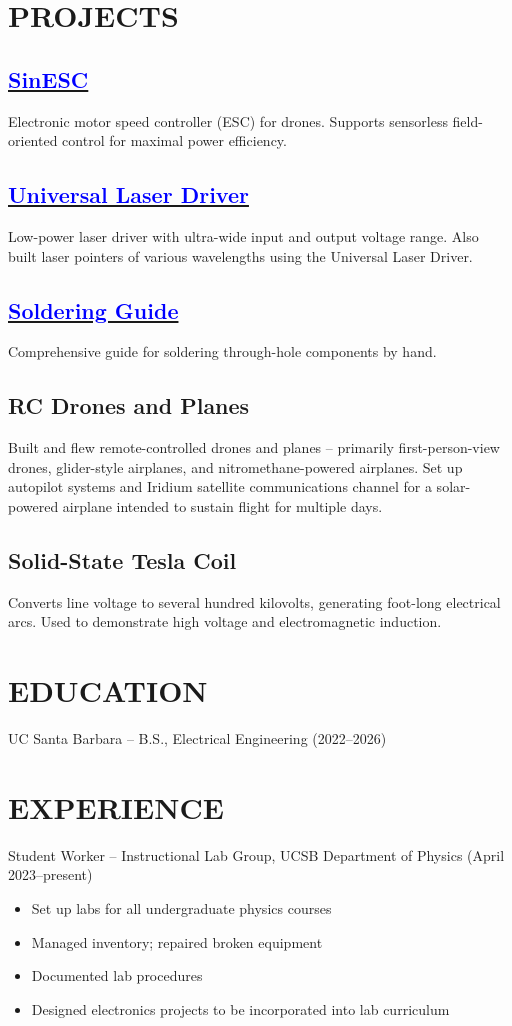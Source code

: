 	\section*{PROJECTS}
	\subsection{\href{https://github.com/SAR-mango/SinESC}{\textcolor{blue}{SinESC}}}
	Electronic motor speed controller (ESC) for drones. Supports sensorless field-oriented control for maximal power efficiency.
	\subsection{\href{https://github.com/SAR-mango/Universal-Laser-Driver}{\textcolor{blue}{Universal Laser Driver}}}
	Low-power laser driver with ultra-wide input and output voltage range. Also built laser pointers of various wavelengths using the Universal Laser Driver.
	\subsection{\href{https://github.com/SAR-mango/soldering-guide/blob/main/Soldering_Guide.pdf}{\textcolor{blue}{Soldering Guide}}}
	Comprehensive guide for soldering through-hole components by hand.
	\subsection{RC Drones and Planes}
	Built and flew remote-controlled drones and planes – primarily first-person-view drones, glider-style airplanes, and nitromethane-powered airplanes. Set up autopilot systems and Iridium satellite communications channel for a solar-powered airplane intended to sustain flight for multiple days.
	\subsection{Solid-State Tesla Coil}
	Converts line voltage to several hundred kilovolts, generating foot-long electrical arcs. Used to demonstrate high voltage and electromagnetic induction.
	
	\section*{EDUCATION}
	UC Santa Barbara – B.S., Electrical Engineering (2022–2026)
	
	\section*{EXPERIENCE}
	Student Worker – Instructional Lab Group, UCSB Department of Physics (April 2023–present)
	\begin{itemize}
		\setlength \itemsep{0.1em}
		\item Set up labs for all undergraduate physics courses
		\item Managed inventory; repaired broken equipment
		\item Documented lab procedures
		\item Designed electronics projects to be incorporated into lab curriculum
	\end{itemize}

